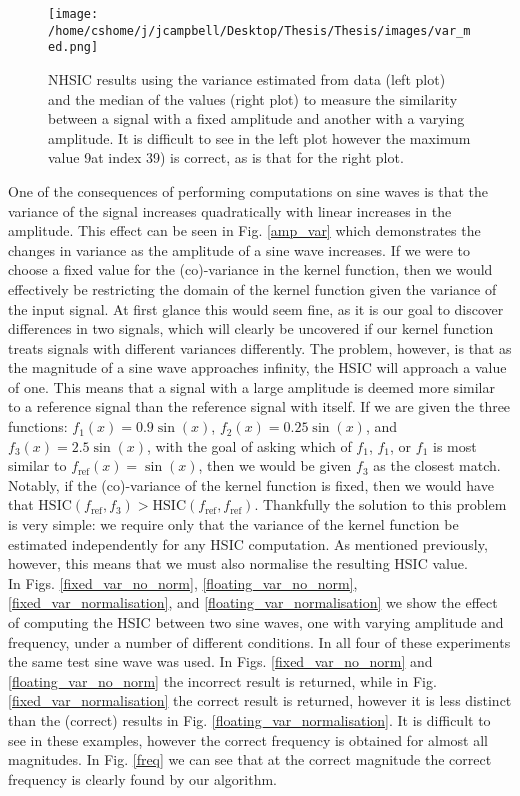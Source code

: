 \begin{figure}[h]
\texttt{[image: /home/cshome/j/jcampbell/Desktop/Thesis/Thesis/images/var\_med.png]}
\caption{NHSIC results using the variance estimated from data (left plot) and the median of the values (right plot) to measure the similarity between a signal with a fixed amplitude and another with a varying amplitude. It is difficult to see in the left plot however the maximum value 9at index 39) is correct, as is that for the right plot.  \label{var_med}}
\end{figure}

One of the consequences of performing computations on sine waves is that the variance of the signal increases quadratically with linear increases in the amplitude. This effect can be seen in Fig. \ref{amp_var} which demonstrates the changes in variance as the amplitude of a sine wave increases. If we were to choose a fixed value for the (co)-variance in the kernel function, then we would effectively be restricting the domain of the kernel function given the variance of the input signal. At first glance this would seem fine, as it is our goal to discover differences in two signals, which will clearly be uncovered if our kernel function treats signals with different variances differently. The problem, however, is that as the magnitude of a sine wave approaches infinity, the HSIC will approach a value of one. This means that a signal with a large amplitude is deemed more similar to a reference signal than the reference signal with itself. If we are given the three functions: $f_1(x) = 0.9\sin(x)$, $f_2(x) = 0.25\sin(x)$, and $f_3(x) = 2.5\sin(x)$, with the goal of asking which of $f_1$, $f_1$, or $f_1$ is most similar to $f_{\text{ref}}(x) = \sin(x)$, then we would be given $f_3$ as the closest match. Notably, if the (co)-variance of the kernel function is fixed, then we would have that $\text{HSIC}(f_{\text{ref}}, f_3) > \text{HSIC}(f_{\text{ref}}, f_{\text{ref}})$. Thankfully the solution to this problem is very simple: we require only that the variance of the kernel function be estimated independently for any HSIC computation. As mentioned previously, however, this means that we must also normalise the resulting HSIC value.  \\

In Figs. \ref{fixed_var_no_norm}, \ref{floating_var_no_norm}, \ref{fixed_var_normalisation}, and \ref{floating_var_normalisation} we show the effect of computing the HSIC between two sine waves, one with varying amplitude and frequency, under a number of different conditions. In all four of these experiments the same test sine wave was used. In Figs. \ref{fixed_var_no_norm} and \ref{floating_var_no_norm} the incorrect result is returned, while in Fig. \ref{fixed_var_normalisation} the correct result is returned, however it is less distinct than the (correct) results in Fig. \ref{floating_var_normalisation}. It is difficult to see in these examples, however the correct frequency is obtained for almost all magnitudes. In Fig. \ref{freq} we can see that at the correct magnitude the correct frequency is clearly found by our algorithm. 



